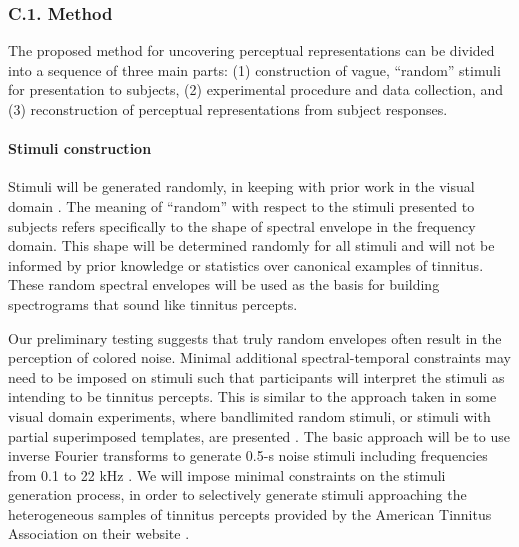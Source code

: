 \documentclass[11pt, notitlepage]{article} %
\begin{document}
\subsubsection*{C.1. Method}

The proposed method for uncovering perceptual representations can be divided
into a sequence of three main parts:
(1) construction of vague, ``random'' stimuli for presentation to subjects,
(2) experimental procedure and data collection,
and (3) reconstruction of perceptual representations from subject responses.


\paragraph{Stimuli construction}

Stimuli will be generated randomly, in keeping with prior work in the visual domain
\cite{gosselinSuperstitiousPerceptionsReveal2003}.
The meaning of ``random'' with respect to the stimuli presented to subjects
refers specifically to the shape of spectral envelope in the frequency domain.
This shape will be determined randomly for all stimuli
and will not be informed by prior knowledge
or statistics over canonical examples of tinnitus.
These random spectral envelopes will be used as the basis for building spectrograms
that sound like tinnitus percepts.

Our preliminary testing suggests that truly random envelopes
often result in the perception of colored noise.
Minimal additional spectral-temporal constraints may need to be imposed on stimuli
such that participants will interpret the stimuli as intending to be tinnitus percepts.
This is similar to the approach taken in some visual domain experiments,
where bandlimited random stimuli, or stimuli with partial superimposed templates,
are presented \cite{smithMeasuringInternalRepresentations2012}.
The basic approach will be to use inverse Fourier transforms to generate 0.5-s noise stimuli
including frequencies from 0.1 to 22 kHz \cite{brimijoinInternalRepresentationVowel2013}.
We will impose minimal constraints on the stimuli generation process,
in order to selectively generate stimuli approaching the heterogeneous samples of tinnitus percepts
provided by the American Tinnitus Association on their website \cite{Symptoms2015}.
\end{document}
